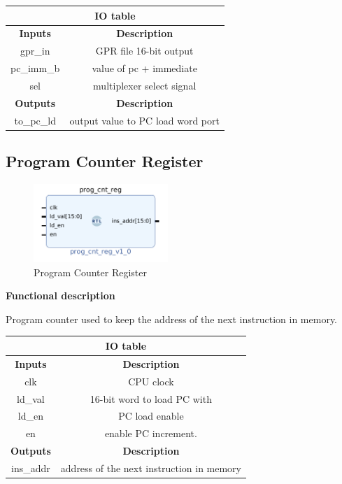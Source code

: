 \documentclass{article}
\begin{document}
\begin{par}
	\begin{center}
		\begin{tabular}{|c|c|}
			\hline 
			\multicolumn{2}{|c|}{\textbf{IO table}} \\
			\hline 
			\textbf{Inputs} & \textbf{Description} \\ 
			\hline 
			gpr\_in & GPR file 16-bit output \\ 
			\hline 
			pc\_imm\_b & value of pc + immediate \\ 
			\hline 
			sel & multiplexer select signal \\ 
			\hline 
			\textbf{Outputs} & \textbf{Description} \\ 
			\hline 
			to\_pc\_ld & output value to PC load word port \\
			\hline
		\end{tabular} 
	\end{center}
	
	\subsection{Program Counter Register}
	
	\begin{figure}[H]
		\centering
		\includegraphics[width=2in]{img/progCnt.png}
		\caption{Program Counter Register}
	\end{figure}
	
	\textbf{Functional description}
	\begin{par}
		Program counter used to keep the address of the next instruction in memory. 
	\end{par}
	
	\begin{center}
		\begin{tabular}{|c|c|}
			\hline 
			\multicolumn{2}{|c|}{\textbf{IO table}} \\
			\hline 
			\textbf{Inputs} & \textbf{Description} \\ 
			\hline 
			clk & CPU clock \\ 
			\hline 
			ld\_val & 16-bit word to load PC with \\ 
			\hline 
			ld\_en & PC load enable \\ 
			\hline 
			en & enable PC increment. \\ 
			\hline 
			\textbf{Outputs} & \textbf{Description} \\ 
			\hline 
			ins\_addr & address of the next instruction in memory \\
			\hline
		\end{tabular}
	\end{center}


\end{par}
\end{document}
